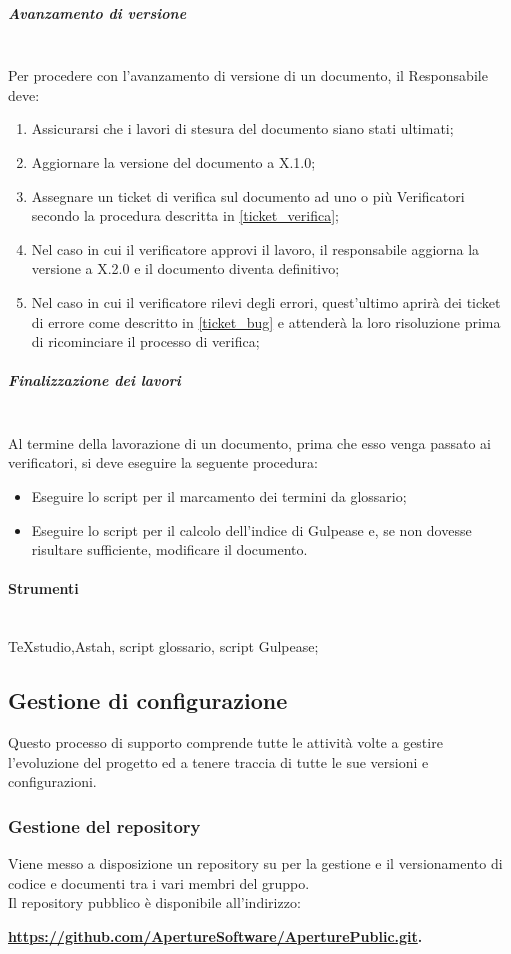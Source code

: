 \subparagraph{Avanzamento di versione} \hfill \\
Per procedere con l'avanzamento di versione di un documento, il Responsabile deve:
\begin{enumerate}
\item Assicurarsi che i lavori di stesura del documento siano stati ultimati;
\item Aggiornare la versione del documento a X.1.0;
\item Assegnare un ticket di verifica sul documento ad uno o più Verificatori secondo la procedura descritta in \ref{ticket_verifica};
\item Nel caso in cui il verificatore approvi il lavoro, il responsabile aggiorna la versione a X.2.0 e il documento diventa definitivo;
\item Nel caso in cui il verificatore rilevi degli errori, quest'ultimo aprirà dei ticket di errore come descritto in \ref{ticket_bug} e attenderà la loro risoluzione prima di ricominciare il processo di verifica;
\end{enumerate}

\subparagraph{Finalizzazione dei lavori} \hfill \\
Al termine della lavorazione di un documento, prima che esso venga passato ai verificatori, si deve eseguire la seguente procedura:
\begin{itemize}
\item Eseguire lo script per il marcamento dei termini da glossario;
\item Eseguire lo script per il calcolo dell'indice di Gulpease e, se non dovesse risultare sufficiente, modificare il documento.
\end{itemize}

\paragraph{Strumenti} \hfill \\
TeXstudio,Astah, script glossario, script Gulpease;



\subsection{Gestione di configurazione}
Questo processo di supporto comprende tutte le attivit\`{a} volte a gestire l'evoluzione del progetto ed a tenere traccia di tutte le sue versioni e configurazioni.

\subsubsection{Gestione del repository}
Viene messo a disposizione un repository  su  per la gestione e il versionamento di codice e documenti tra i vari membri del gruppo.\\
Il repository pubblico è disponibile all'indirizzo: \\
\begin{center}
\textbf{\url{https://github.com/ApertureSoftware/AperturePublic.git}.}
\end{center}

